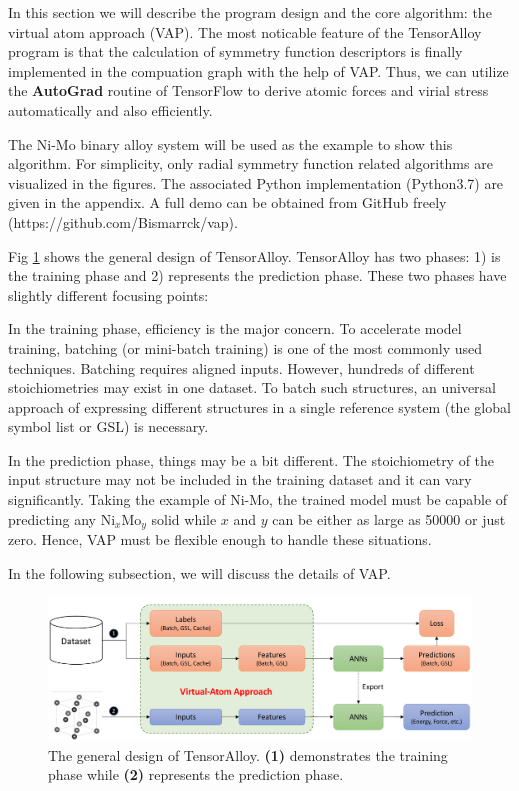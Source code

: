 \documentclass[preprint]{revtex4-2}
\begin{document}
In this section we will describe the program design and the core algorithm: 
the virtual atom approach (VAP). The most noticable feature of the TensorAlloy 
program is that the calculation of symmetry function descriptors is finally 
implemented in the compuation graph with the help of VAP. Thus, we can utilize 
the \textbf{AutoGrad} routine of TensorFlow to derive atomic forces and virial 
stress automatically and also efficiently.

The Ni-Mo binary alloy system will be used as the example to show this 
algorithm. For simplicity, only radial symmetry function related algorithms are 
visualized in the figures. The associated Python implementation (Python3.7) are 
given in the appendix. A full demo can be obtained from GitHub freely 
(https://github.com/Bismarrck/vap).

Fig \ref{fig:program_design} shows the general design of TensorAlloy.
TensorAlloy has two phases: 1) is the training phase and 2) represents the 
prediction phase. These two phases have slightly different focusing points:

In the training phase, efficiency is the major concern. To accelerate model 
training, batching (or mini-batch training) is one of the most commonly used 
techniques. Batching requires aligned inputs. However, hundreds of different 
stoichiometries may exist in one dataset. To batch such structures, an universal 
approach of expressing different structures in a single reference system (the 
global symbol list or GSL) is necessary.

In the prediction phase, things may be a bit different. The stoichiometry of 
the input structure may not be included in the training dataset and it can vary 
significantly. Taking the example of Ni-Mo, the trained model must be capable of 
predicting any $\mathrm{Ni}_{x}\mathrm{Mo}_{y}$ solid while $x$ and $y$ can be 
either as large as 50000 or just zero. Hence, VAP must be flexible enough to 
handle these situations.

In the following subsection, we will discuss the details of VAP.

% 
%
\begin{figure}[h!]
\centering
\includegraphics[scale=0.58]{figures/Fig1.pdf}
\caption{\label{fig:program_design} The general design of TensorAlloy. 
\textbf{(1)} demonstrates the training phase while \textbf{(2)} represents the 
prediction phase.
}
\end{figure}
\end{document}
